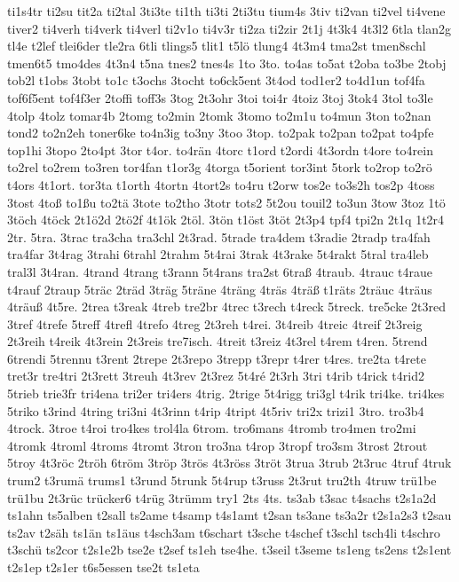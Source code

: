 {ti1s4tr
ti2su
tit2a
ti2tal
3ti3te
ti1th
ti3ti
2ti3tu
tium4s
3tiv
ti2van
ti2vel
ti4vene
tiver2
ti4verh
ti4verk
ti4verl
ti2v1o
ti4v3r
ti2za
ti2zir
2t1j
4t3k4
4t3l2
6tla
tlan2g
tl4e
t2lef
tlei6der
tle2ra
6tli
tlings5
tlit1
t5lö
tlung4
4t3m4
tma2st
tmen8schl
tmen6t5
tmo4des
4t3n4
t5na
tnes2
tnes4s
1to
3to.
to4as
to5at
t2oba
to3be
2tobj
tob2l
t1obs
3tobt
to1c
t3ochs
3tocht
to6ck5ent
3t4od
tod1er2
to4d1un
tof4fa
tof6f5ent
tof4f3er
2toffi
toff3s
3tog
2t3ohr
3toi
toi4r
4toiz
3toj
3tok4
3tol
to3le
4tolp
4tolz
tomar4b
2tomg
to2min
2tomk
3tomo
to2m1u
to4mun
3ton
to2nan
tond2
to2n2eh
toner6ke
to4n3ig
to3ny
3too
3top.
to2pak
to2pan
to2pat
to4pfe
top1hi
3topo
2to4pt
3tor
t4or.
to4rän
4torc
t1ord
t2ordi
4t3ordn
t4ore
to4rein
to2rel
to2rem
to3ren
tor4fan
t1or3g
4torga
t5orient
tor3int
5tork
to2rop
to2rö
t4ors
4t1ort.
tor3ta
t1orth
4tortn
4tort2s
to4ru
t2orw
tos2e
to3s2h
tos2p
4toss
3tost
4toß
to1ßu
to2tä
3tote
to2tho
3totr
tots2
5t2ou
touil2
to3un
3tow
3toz
1tö
3töch
4töck
2t1ö2d
2tö2f
4t1ök
2töl.
3tön
t1öst
3töt
2t3p4
tpf4
tpi2n
2t1q
1t2r4
2tr.
5tra.
3trac
tra3cha
tra3chl
2t3rad.
5trade
tra4dem
t3radie
2tradp
tra4fah
tra4far
3t4rag
3trahi
6trahl
2trahm
5t4rai
3trak
4t3rake
5t4rakt
5tral
tra4leb
tral3l
3t4ran.
4trand
4trang
t3rann
5t4rans
tra2st
6traß
4traub.
4trauc
t4raue
t4rauf
2traup
5träc
2träd
3träg
5träne
4träng
4träs
4träß
t1räts
2träuc
4träus
4träuß
4t5re.
2trea
t3reak
4treb
tre2br
4trec
t3rech
t4reck
5treck.
tre5cke
2t3red
3tref
4trefe
5treff
4trefl
4trefo
4treg
2t3reh
t4rei.
3t4reib
4treic
4treif
2t3reig
2t3reih
t4reik
4t3rein
2t3reis
tre7isch.
4treit
t3reiz
4t3rel
t4rem
t4ren.
5trend
6trendi
5trennu
t3rent
2trepe
2t3repo
3trepp
t3repr
t4rer
t4res.
tre2ta
t4rete
tret3r
tre4tri
2t3rett
3treuh
4t3rev
2t3rez
5t4ré
2t3rh
3tri
t4rib
t4rick
t4rid2
5trieb
trie3fr
tri4ena
tri2er
tri4ers
4trig.
2trige
5t4rigg
tri3gl
t4rik
tri4ke.
tri4kes
5triko
t3rind
4tring
tri3ni
4t3rinn
t4rip
4tript
4t5riv
tri2x
trizi1
3tro.
tro3b4
4trock.
3troe
t4roi
tro4kes
trol4la
6trom.
tro6mans
4tromb
tro4men
tro2mi
4tromk
4troml
4troms
4tromt
3tron
tro3na
t4rop
3tropf
tro3sm
3trost
2trout
5troy
4t3röc
2tröh
6tröm
3tröp
3trös
4t3röss
3tröt
3trua
3trub
2t3ruc
4truf
4truk
trum2
t3rumä
trums1
t3rund
5trunk
5t4rup
t3russ
2t3rut
tru2th
4truw
trü1be
trü1bu
2t3rüc
trücker6
t4rüg
3trümm
try1
2ts
4ts.
ts3ab
t3sac
t4sachs
t2s1a2d
ts1ahn
ts5alben
t2sall
ts2ame
t4samp
t4s1amt
t2san
ts3ane
ts3a2r
t2s1a2s3
t2sau
ts2av
t2säh
ts1än
ts1äus
t4sch3am
t6schart
t3sche
t4schef
t3schl
tsch4li
t4schro
t3schü
ts2cor
t2s1e2b
tse2e
t2sef
ts1eh
tse4he.
t3seil
t3seme
ts1eng
ts2ens
t2s1ent
t2s1ep
t2s1er
t6s5essen
tse2t
ts1eta
}
